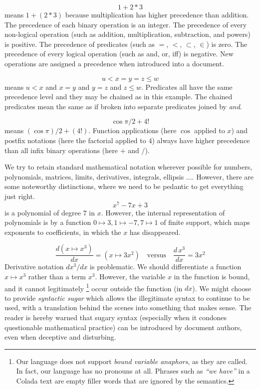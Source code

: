 \documentclass[12pt]{article}
\numberwithin{definition}{section}
\begin{document}
\[
\boxed{1 + 2 * 3}
\]
means $1 + (2*3)$ because 
multiplication has higher precedence than
addition.  The precedence of each binary operation is an integer.  The
precedence of every non-logical operation (such as addition,
multiplication, subtraction, and powers) is positive. The precedence
of predicates (such as $=$, $<$, $\subset$, $\in$) is zero. The
precedence of every logical operation (such as and, or, iff) is
negative.  New operations are assigned a precedence when introduced
into a document.

\[
\boxed{u < x = y = z \le w}
\]
means $u < x$ and $x = y$ and $y = z$ and $z\le w$.  Predicates all have the
same precedence level and they may be chained as in this example.
The chained predicates mean the same as if broken into separate predicates
joined by \emph{and}.

\[
\boxed{\cos \pi/2 + 4!}
\]
means $(\cos\pi)/2 + (4!)$.  Function applications (here $\cos$
applied to $x$) and postfix notations (here the factorial applied to
$4$) always have higher precedence than all infix binary operations
(here $+$ and $/$).


We try to retain standard mathematical notation wherever possible for
numbers, polynomials, matrices, limits, derivatives, integrals,
ellipsis $\ldots$.  However, there are some noteworthy distinctions,
where we need to be pedantic to get everything just right.
\[
\boxed{x^7 - 7 x + 3}
\]
is a polynomial of degree $7$ in $x$. However, the internal representation
of polynomials is by a function $0\mapsto3,1\mapsto-7,7\mapsto1$
of finite support, which maps exponents to coefficients,
in which the $x$ has disappeared.

\[
\boxed{\frac{d (x\mapsto x^3)}{dx} = (x \mapsto 3 x^2)}\quad\text{versus}\quad
\boxed{\frac{d\,x^3}{dx} = 3 x^2}
\]
Derivative notation $dx^3/dx$ is problematic. We should differentiate
a function $x \mapsto x^3$ rather than a term $x^3$.  However, the
variable $x$ in the function is bound, and it cannot legitimately%
%
\footnote{Our language does not support \emph{bound variable
    anaphors}, as they are called. In fact, our language has no
  pronouns at all. Phrases such as \emph{``we have''} in a Colada text
  are empty filler words that are ignored by the semantics.}  
%
occur outside the function (in $dx$).  We might choose to provide
\emph{syntactic sugar} which allows the illegitimate syntax to
continue to be used, with a translation behind the scenes into
something that makes sense.  The reader is hereby warned that sugary
syntax (especially when it condones questionable mathematical
practice) can be introduced by document authors, even when deceptive
and disturbing.
\end{document}
